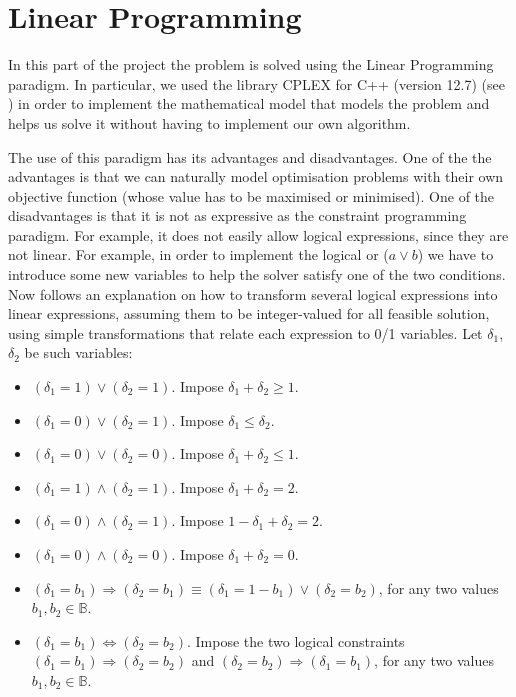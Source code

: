 \section{Linear Programming}
\label{sec:linear-programming}

In this part of the project the problem is solved using the Linear Programming
paradigm. In particular, we used the library CPLEX for C++ (version 12.7)
(see \cite{CplexWEB}) in order to implement the mathematical model that models
the problem and helps us solve it without having to implement our own algorithm.

\hfill

The use of this paradigm has its advantages and disadvantages.
One of the the advantages is that we can naturally model optimisation problems
with their own objective function (whose value has to be maximised or minimised).
One of the disadvantages is that it is not as expressive as the constraint
programming paradigm. For example, it does not easily allow logical expressions,
since they are not linear. For example, in order to implement the
logical or ($a \vee b$) we have to introduce some new variables to help the
solver satisfy one of the two conditions. Now follows an explanation on how to
transform several logical expressions into linear expressions, assuming them
to be integer-valued for all feasible solution, using simple transformations
that relate each expression to 0/1 variables. Let $\delta_1$, $\delta_2$ be such
variables:

\begin{itemize}	
	\item $(\delta_1 = 1) \vee (\delta_2 = 1)$. Impose $\delta_1 + \delta_2 \ge 1$.
	
	\item $(\delta_1 = 0) \vee (\delta_2 = 1)$.	Impose $\delta_1 \le \delta_2$.
	
	\item $(\delta_1 = 0) \vee (\delta_2 = 0)$.	Impose $\delta_1 + \delta_2 \le 1$.
	
	\item $(\delta_1 = 1) \wedge (\delta_2 = 1)$. Impose $\delta_1 + \delta_2 = 2$.
	
	\item $(\delta_1 = 0) \wedge (\delta_2 = 1)$. Impose $1 - \delta_1 + \delta_2 = 2$.	
	
	\item $(\delta_1 = 0) \wedge (\delta_2 = 0)$. Impose $\delta_1 + \delta_2 = 0$.
	
	\item $(\delta_1 = b_1) \Longrightarrow (\delta_2 = b_1) \equiv (\delta_1 = 1 - b_1) \vee (\delta_2 = b_2)$,
	for any two values $b_1,b_2 \in \mathbb{B}$.
	
	\item $(\delta_1 = b_1) \Longleftrightarrow (\delta_2 = b_2)$. Impose the two logical constraints
	$(\delta_1 = b_1) \Longrightarrow (\delta_2 = b_2)$ and $(\delta_2 = b_2) \Longrightarrow (\delta_1 = b_1)$,
	for any two values $b_1,b_2 \in \mathbb{B}$.
	
\end{itemize}

